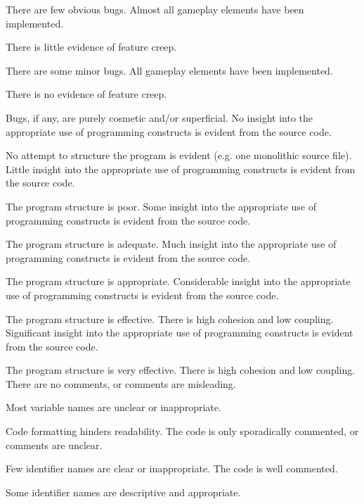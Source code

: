 \documentclass{../fal_assignment}
\begin{document}
\begin{markingrubric}
            \par There are few obvious bugs.
        \grade Almost all gameplay elements have been implemented.
            \par There is little evidence of feature creep.
            \par There are some minor bugs.
        \grade All gameplay elements have been implemented.
            \par There is no evidence of feature creep.
            \par Bugs, if any, are purely cosmetic and/or superficial.
%
        \grade\fail No insight into the appropriate use of programming constructs is evident from the source code.
            \par No attempt to structure the program is evident (e.g. one monolithic source file).
        \grade Little insight into the appropriate use of programming constructs is evident from the source code.
            \par The program structure is poor.
        \grade Some insight into the appropriate use of programming constructs is evident from the source code.
            \par The program structure is adequate.
        \grade Much insight into the appropriate use of programming constructs is evident from the source code.
            \par The program structure is appropriate.
        \grade Considerable insight into the appropriate use of programming constructs is evident from the source code.
            \par The program structure is effective. There is high cohesion and low coupling.
        \grade Significant insight into the appropriate use of programming constructs is evident from the source code.
            \par The program structure is very effective. There is high cohesion and low coupling.
%
        \grade\fail There are no comments, or comments are misleading.
            \par Most variable names are unclear or inappropriate.
            \par Code formatting hinders readability.
        \grade The code is only sporadically commented, or comments are unclear.
            \par Few identifier names are clear or inappropriate.
        \grade The code is well commented.
            \par Some identifier names are descriptive and appropriate.

\end{markingrubric}
\end{document}
